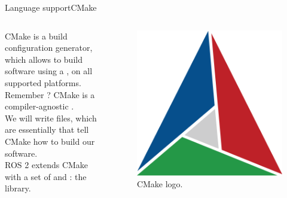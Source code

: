 \begin{frame}{Language support}{CMake}
  \begin{columns}
    CMake is a  build configuration generator, which allows to build software using a ,  on all supported platforms.\\
    Remember ? CMake is a compiler-agnostic .\\
    \bigskip
    We will write  files, which are essentially  that tell CMake how to build our software.\\
    \bigskip
    ROS 2 extends CMake with a set of  and : the \href{https://docs.ros.org/en/humble/How-To-Guides/Ament-CMake-Documentation.html}{} library.

    \begin{figure}
      \centering
      \includegraphics[width=.7\textwidth]{cmake}
      \caption{CMake logo.}
      \label{fig:cmake}
    \end{figure}
  \end{columns}
\end{frame}
